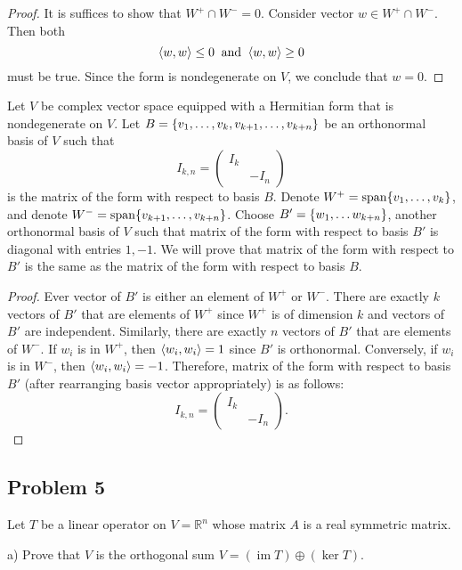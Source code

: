 \documentclass{article}
\theoremstyle{definition}
\DeclareMathOperator{\im}{\operatorname{im}}
\DeclareMathOperator{\spn}{\operatorname{span}}
\newcommand{\R}{\mathbb{R}}
\DeclarePairedDelimiter\set{\{}{\}}
\DeclarePairedDelimiter\bilform{\langle}{\rangle}
\begin{document}
\begin{proof}

It is suffices to show that $W^+ \cap W^- = 0$.
Consider vector $w \in W^+ \cap W^-$.
Then both
\[
    \bilform{w,w} \leq 0
    \> \text{ and } \>
    \bilform{w,w} \geq 0
\]
must be true.
Since the form is nondegenerate on $V$, we conclude that $w = 0$.

\end{proof}

Let $V$ be complex vector space equipped with a Hermitian form that is nondegenerate on $V$.
Let $B = \set{ v_1, \dots, v_k, v_{k+1}, \dots, v_{k+n} }$ be an orthonormal basis of $V$ such that
\[
    I_{k, n} =
    \begin{pmatrix}
        I_k & \\
        & -I_n
    \end{pmatrix}
\]
is the matrix of the form with respect to basis $B$.
Denote $W^+ = \spn \set{v_1, \dots, v_k}$, and denote $W^- = \spn \set{v_{k+1}, \dots, v_{k+n}}$.
Choose $B' = \set{ w_1, \dots w_{k+n} }$, another orthonormal basis of $V$ such that matrix of the form with respect to basis $B'$ is diagonal with entries $1, -1$.
We will prove that matrix of the form with respect to $B'$ is the same as the matrix of the form with respect to basis $B$.

\begin{proof}

Ever vector of $B'$ is either an element of $W^+$ or $W^-$.
There are exactly $k$ vectors of $B'$ that are elements of $W^+$ since $W^+$ is of dimension $k$ and vectors of $B'$ are independent.
Similarly, there are exactly $n$ vectors of $B'$ that are elements of $W^-$.
If $w_i$ is in $W^+$, then $\bilform{w_i, w_i} = 1$ since $B'$ is orthonormal.
Conversely, if $w_i$ is in $W^-$, then $\bilform{w_i, w_i} = -1$.
Therefore, matrix of the form with respect to basis $B'$ (after rearranging basis vector appropriately) is as follows: 
\[
    I_{k, n} =
    \begin{pmatrix}
        I_k & \\
        & -I_n
    \end{pmatrix}.
\]

\end{proof}


\subsection*{Problem 5}

\begin{tcolorbox}
Let $T$ be a linear operator on $V = \R^n$ whose matrix $A$ is a real symmetric matrix.

a) Prove that $V$ is the orthogonal sum $V = (\im T) \oplus (\ker T)$.
\end{tcolorbox}
\end{document}
